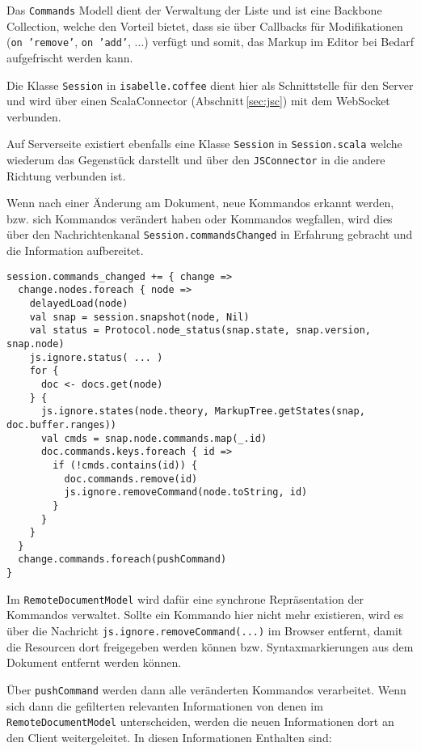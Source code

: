 Das \texttt{Commands} Modell dient der Verwaltung der Liste und ist eine Backbone Collection, welche
den Vorteil bietet, dass sie über Callbacks für Modifikationen (\texttt{on 'remove'}, \texttt{on
'add'}, ...) verfügt und somit, das Markup im Editor bei Bedarf aufgefrischt werden kann.

Die Klasse \texttt{Session} in \texttt{isabelle.coffee} dient hier als Schnittstelle für den Server
und wird über einen ScalaConnector (Abschnitt\,\ref{sec:jsc}) mit dem WebSocket verbunden.

Auf Serverseite existiert ebenfalls eine Klasse \texttt{Session} in \texttt{Session.scala} welche
wiederum das Gegenstück darstellt und über den \texttt{JSConnector} in die andere Richtung verbunden
ist. 

Wenn nach einer Änderung am Dokument, neue Kommandos erkannt werden, bzw. sich Kommandos verändert
haben oder Kommandos wegfallen, wird dies über den Nachrichtenkanal \texttt{Session.commandsChanged}
in Erfahrung gebracht und die Information aufbereitet.

\begin{lstlisting}
session.commands_changed += { change =>
  change.nodes.foreach { node =>
    delayedLoad(node)
    val snap = session.snapshot(node, Nil)
    val status = Protocol.node_status(snap.state, snap.version, snap.node)      
    js.ignore.status( ... )      
    for {
      doc <- docs.get(node)        
    } {        
      js.ignore.states(node.theory, MarkupTree.getStates(snap, doc.buffer.ranges))
      val cmds = snap.node.commands.map(_.id)
      doc.commands.keys.foreach { id =>
        if (!cmds.contains(id)) {
          doc.commands.remove(id)
          js.ignore.removeCommand(node.toString, id)
        }
      }
    }       
  }
  change.commands.foreach(pushCommand)    
}
\end{lstlisting}

Im \texttt{RemoteDocumentModel} wird dafür eine synchrone Repräsentation der Kommandos verwaltet.
Sollte ein Kommando hier nicht mehr existieren, wird es über die Nachricht
\texttt{js.ignore.removeCommand(...)} im Browser entfernt, damit die Resourcen dort freigegeben
werden können bzw. Syntaxmarkierungen aus dem Dokument entfernt werden können.

Über \texttt{pushCommand} werden dann alle veränderten Kommandos verarbeitet. Wenn sich dann die
gefilterten relevanten Informationen von denen im \texttt{RemoteDocumentModel} unterscheiden,
werden die neuen Informationen dort an den Client weitergeleitet. In diesen Informationen Enthalten
sind:

